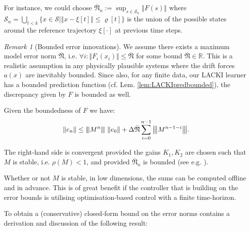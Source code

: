 \documentclass{article} %
\theoremstyle{definition}
\theoremstyle{remark}
\newtheorem{remark}[thm]{Remark}
\newcommand{\matnorm}[1]{{\left\vert\kern-0.25ex\left\vert\kern-0.25ex\left\vert #1 
    \right\vert\kern-0.25ex\right\vert\kern-0.25ex\right\vert}}
\newcommand{\norm}[1]{\left\Vert#1\right\Vert}
\newcommand{\Real}{\mathbb R}
\newcommand{\vc}[1]{#1}
\newcommand{\specrad}{\rho}
\newcommand{\iaspace}{\ensuremath{ \mathcal S}} %
\newcommand{\maxerrn}{\bar{\mathfrak N}} %
\newcommand{\tinc}{\ensuremath{ \Delta}}
\begin{document}
For instance, we could choose $\maxerrn_n := \sup_{s \in \iaspace_n} \norm{F(s)} $
	where $\iaspace_n = \bigcup_{t< k} \{x \in \iaspace | \norm{x - \xi[t]} \leq \varrho[t] \}$ is the union of the possible states around the reference trajectory $\xi[\cdot]$ at previous time steps.
\begin{remark}	[Bounded error innovations] 
We assume there exists a maximum model error norm $\maxerrn$, i.e. $\forall i: \norm{F_i(x_i)} \leq \maxerrn$ for some bound $\maxerrn \in \Real$.
This is a realistic assumption in any physically plausible systems where the drift forces $a(x)$ are inevitably bounded. Since also, for any finite data, our LACKI learner has a bounded prediction function (cf. Lem. \ref{lem:LACKIpredbounded}), the discrepancy given by $F$ is bounded as well. 
\label{rem:bnd_err_innovations}
\end{remark}

Given the boundedness of $F$ we have: \vspace{-1em}
\begin{equation}
	\norm{\vc e_n} \leq   \matnorm{M^{n}} \, \norm{\vc e_0} + \tinc \maxerrn \sum_{i=0}^{n-1}  \matnorm{M^{n-1-i}}.
\end{equation}

The right-hand side is convergent provided the gains $K_1, K_2$ are chosen such that $M$ is stable, i.e. $\specrad(M) <1$, and provided $\maxerrn_n$ is bounded (see e.g. \cite{calliess2014_thesis}). 

Whether or not $M$ is stable, in low dimensions, the sums can be computed offline and in advance. This is of great benefit if 
 the controller that is building on the error bounds is utilising optimisation-based control with a finite time-horizon.   

To obtain a (conservative) closed-form bound on the error norms \cite{calliess2014_thesis}
contains a derivation and discussion of the following result:
\end{document}
